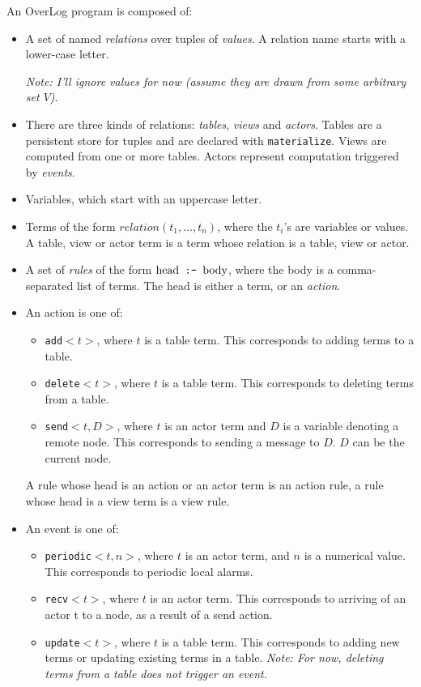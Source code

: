 \documentclass{article}
\newcommand{\code}[1]{{\tt \small #1}}
\newcommand{\imp}{\mbox{\tt \ :-\ }}
\begin{document}
An OverLog program is composed of:
\begin{itemize}
\item A set of named \emph{relations} over tuples of \emph{values}. A
relation name starts with a lower-case letter. 

\emph{Note: I'll ignore values for now (assume they are drawn from some
arbitrary set $V$)}.

\item There are three kinds of relations: \emph{tables}, \emph{views} and
\emph{actors}. Tables are a persistent store for tuples and are
declared with \code{materialize}. Views are computed
from one or more tables. Actors represent computation triggered by
\emph{events}. 

\item Variables, which start with an uppercase letter.

\item Terms of the form $relation(t_1, \ldots, t_n)$, where the $t_i$'s are
variables or values. A table, view or actor term is a term whose relation
is a table, view or actor.

\item A set of \emph{rules} of the form $\mbox{head} \imp \mbox{body}$,
where the body is a comma-separated list of terms. The head is either a
term, or an \emph{action}.

\item An action is one of:
  \begin{itemize}
  \item \code{add$<t>$}, where $t$ is a table term. This corresponds to 
    adding terms to a table.

  \item \code{delete$<t>$}, where $t$ is a table term. This corresponds
    to deleting terms from a table.

  \item \code{send$<t, D>$}, where $t$ is an actor term and $D$ is a
    variable denoting a remote node. This corresponds to sending a
    message to $D$. $D$ can be the current node.
  \end{itemize}

  A rule whose head is an action or an actor term is an action rule, a
rule whose head is a view term is a view rule.

\item An event is one of:
  \begin{itemize}
    \item \code{periodic$<t, n>$}, where $t$ is an actor term, and $n$
    is a numerical value. This corresponds to periodic local alarms.
    \item \code{recv$<t>$}, where $t$ is an actor term. This corresponds
    to arriving of an actor t to a node, as a result of a send action.
    \item \code{update$<t>$}, where $t$ is a table term. This
    corresponds to adding new terms or updating existing terms in a
    table. \emph{Note: For now, deleting terms from a table does not trigger an event.}
  \end{itemize}

\end{itemize}
\end{document}
